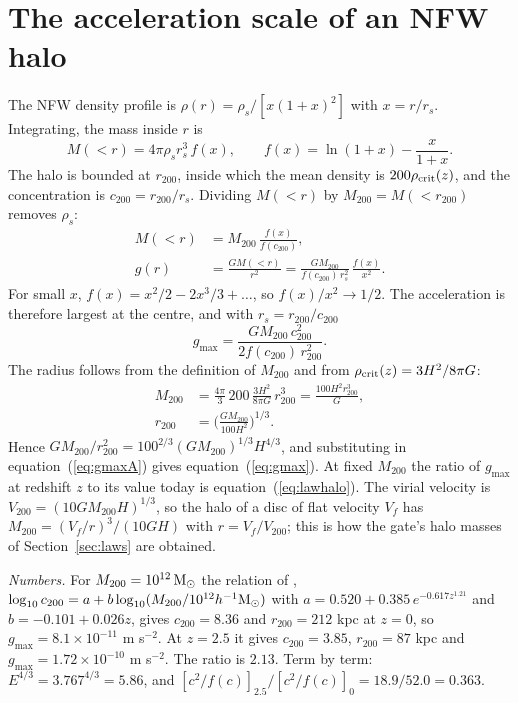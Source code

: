 \documentclass[fleqn,usenatbib]{mnras}
\begin{document}



\appendix
\section{The acceleration scale of an NFW halo}
\label{app:nfw}
The NFW density profile is $\rho(r)=\rho_s/[x(1+x)^2]$ with $x=r/r_s$. Integrating, the mass inside $r$ is
\begin{equation}
M(<r)=4\pi\rho_sr_s^3\,f(x),\qquad f(x)=\ln(1+x)-\frac{x}{1+x} .
\end{equation}
The halo is bounded at $r_{200}$, inside which the mean density is $200\rho_{\rm crit}(z)$, and the concentration is $c_{200}=r_{200}/r_s$. Dividing $M(<r)$ by $M_{200}=M(<r_{200})$ removes $\rho_s$:
\begin{align}
M(<r)&=M_{200}\,\frac{f(x)}{f(c_{200})},\\
g(r)&=\frac{GM(<r)}{r^2}=\frac{GM_{200}}{f(c_{200})\,r_s^2}\,\frac{f(x)}{x^2} .
\end{align}
For small $x$, $f(x)=x^2/2-2x^3/3+\ldots$, so $f(x)/x^2\to1/2$. The acceleration is therefore largest at the centre, and with $r_s=r_{200}/c_{200}$
\begin{equation}
g_{\max}=\frac{GM_{200}\,c_{200}^2}{2f(c_{200})\,r_{200}^2} .
\label{eq:gmaxA}
\end{equation}
The radius follows from the definition of $M_{200}$ and from $\rho_{\rm crit}(z)=3H^2/8\pi G$:
\begin{align}
M_{200}&=\frac{4\pi}{3}\,200\,\frac{3H^2}{8\pi G}\,r_{200}^3=\frac{100H^2r_{200}^3}{G},\\
r_{200}&=\Big(\frac{GM_{200}}{100H^2}\Big)^{1/3} .
\end{align}
Hence $GM_{200}/r_{200}^2=100^{2/3}(GM_{200})^{1/3}H^{4/3}$, and substituting in equation~(\ref{eq:gmaxA}) gives equation~(\ref{eq:gmax}). At fixed $M_{200}$ the ratio of $g_{\max}$ at redshift $z$ to its value today is equation~(\ref{eq:lawhalo}). The virial velocity is $V_{200}=(10GM_{200}H)^{1/3}$, so the halo of a disc of flat velocity $V_f$ has $M_{200}=(V_f/r)^3/(10GH)$ with $r=V_f/V_{200}$; this is how the gate's halo masses of Section~\ref{sec:laws} are obtained.

\emph{Numbers.} For $M_{200}=10^{12}\,{\rm M_\odot}$ the relation of \citet{DuttonMaccio2014}, $\log_{10}c_{200}=a+b\log_{10}(M_{200}/10^{12}h^{-1}{\rm M_\odot})$ with $a=0.520+0.385\,e^{-0.617z^{1.21}}$ and $b=-0.101+0.026z$, gives $c_{200}=8.36$ and $r_{200}=212$ kpc at $z=0$, so $g_{\max}=8.1\times10^{-11}$ m s$^{-2}$. At $z=2.5$ it gives $c_{200}=3.85$, $r_{200}=87$ kpc and $g_{\max}=1.72\times10^{-10}$ m s$^{-2}$. The ratio is $2.13$. Term by term: $E^{4/3}=3.767^{4/3}=5.86$, and $[c^2/f(c)]_{2.5}/[c^2/f(c)]_0=18.9/52.0=0.363$.
\end{document}
